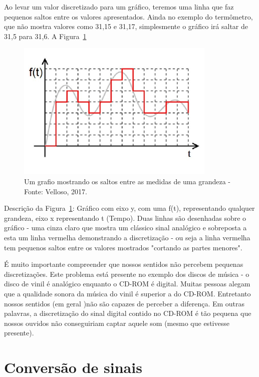 Ao levar um valor discretizado para um gráfico, teremos uma linha que faz pequenos saltos entre os valores apresentados. Ainda no exemplo do termômetro, que não mostra valores como 31,15 e 31,17, simplesmente o gráfico irá saltar de 31,5 para 31,6. A Figura~\ref{fig:sinaldiscretizado}

\begin{figure}[h]
	\begin{center}
		\includegraphics[width=0.85\textwidth]{img/sinais/sinalDiscretizado.png}
		\caption{Um grafio mostrando os saltos entre as medidas de uma grandeza - Fonte: Velloso, 2017.}
		\label{fig:sinaldiscretizado}
	\end{center}
\end{figure}

Descrição da Figura~\ref{fig:sinaldiscretizado}: Gráfico com eixo y, com uma f(t), representando qualquer grandeza, eixo x representando t (Tempo). Duas linhas são desenhadas sobre o gráfico - uma cinza claro que mostra um clássico sinal analógico e sobreposta a esta um linha vermelha demonstrando a discretização - ou seja a linha vermelha tem pequenos saltos entre os valores mostrados "cortando as partes menores".

É muito importante compreender que nossos sentidos não percebem pequenas discretizações. Este problema está presente no exemplo dos discos de música - o disco de vinil é analógico enquanto o CD-ROM é digital. Muitas pessoas alegam que a qualidade sonora da música do vinil é superior a do CD-ROM. Entretanto nossos sentidos (em geral )não são capazes de perceber a diferença. Em outras palavras, a discretização do sinal digital contido no CD-ROM é tão pequena que nossos ouvidos não conseguiriam captar aquele som (mesmo que estivesse presente).

\section{Conversão de sinais}
\label{conversão}

